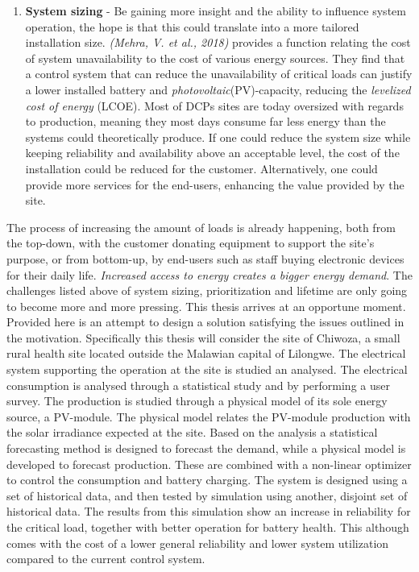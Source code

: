\begin{enumerate}
    \item \textbf{System sizing}    -    Be gaining more insight and the ability to influence system operation, the hope is that this could translate into a more tailored installation size. \textit{(Mehra, V. et al., 2018)} provides a function relating the cost of system unavailability to the cost of various energy sources.\cite{Mehra2018-xs} They find that a control system that can reduce the unavailability of critical loads can justify a lower installed battery and \textit{photovoltaic}(PV)-capacity, reducing the \textit{levelized cost of energy} (LCOE). Most of DCPs sites are today oversized with regards to production, meaning they most days consume far less energy than the systems could theoretically produce. If one could reduce the system size while keeping reliability and availability above an acceptable level, the cost of the installation could be reduced for the customer. Alternatively, one could provide more services for the end-users, enhancing the value provided by the site.
\end{enumerate}

The process of increasing the amount of loads is already happening, both from the top-down, with the customer donating equipment to support the site's purpose, or from bottom-up, by end-users such as staff buying electronic devices for their daily life. \textit{Increased access to energy creates a bigger energy demand}. The challenges listed above of system sizing, prioritization and lifetime are only going to become more and more pressing. This thesis arrives at an opportune moment.\\


Provided here is an attempt to design a solution satisfying the issues outlined in the motivation. Specifically this thesis will consider the site of Chiwoza, a small rural health site located outside the Malawian capital of Lilongwe. The electrical system supporting the operation at the site is studied an analysed. The electrical consumption is analysed through a statistical study and by performing a user survey. The production is studied through a physical model of its sole energy source, a PV-module. The physical model relates the PV-module production with the solar irradiance expected at the site. Based on the analysis a statistical forecasting method is designed to forecast the demand, while a physical model is developed to forecast production. These are combined with a non-linear optimizer to control the consumption and battery charging. The system is designed using a set of historical data, and then tested by simulation using another, disjoint set of historical data. The results from this simulation show an increase in reliability for the critical load, together with better operation for battery health. This although comes with the cost of a lower general reliability and lower system utilization compared to the current control system. 

